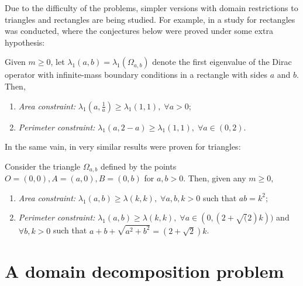 Due to the difficulty of the problems, simpler versions with domain restrictions to triangles and rectangles are being studied. For example, in \cite{briet2022spectral} a study for rectangles was conducted, where the conjectures below were proved under some extra hypothesis:
\begin{conjecture}\label{david_conjectures}
    Given \(m \geq 0\), let \(\lambda_1(a, b) = \lambda_1(\Omega_{a, b})\) denote the first eigenvalue of the Dirac operator with infinite-mass boundary conditions in a rectangle with sides \(a\) and \(b\). Then,
    \begin{enumerate}
        \item \textit{Area constraint: } \(\lambda_1(a, \frac{1}{a}) \geq \lambda_1(1, 1), \; \forall a>0 \);
        \item \textit{Perimeter constraint: } \(\lambda_1(a, 2-a) \geq \lambda_1(1, 1), \; \forall a\in (0, 2)\).
    \end{enumerate}
\end{conjecture}
In the same vain, in \cite{vu2023spectral} very similar results were proven for triangles:
\begin{conjecture}\label{triangle_conjectures}
    Consider the triangle \(\Omega_{a, b}\) defined by the points \(O=(0, 0), A=(a, 0), B=(0, b)\) for \(a, b>0\). Then, given any \(m \geq 0\),
    \begin{enumerate}
        \item \textit{Area constraint: } \(\lambda_1(a, b) \geq \lambda(k, k),\; \forall a, b, k >0\) such that \(ab=k^2\);
        \item \textit{Perimeter constraint: } \(\lambda_1(a, b) \geq \lambda(k, k),\; \forall a \in (0, (2+\sqrt(2)k))\) and \(\forall b, k > 0\) such that \(a+b+\sqrt{a^2+b^2}=(2+\sqrt{2})k\).
    \end{enumerate}
\end{conjecture}

\section{A domain decomposition problem}\label{domain_decomp_problem}

